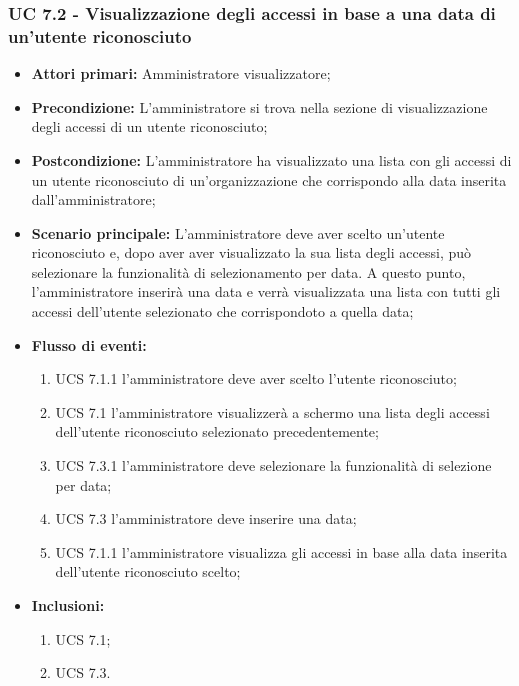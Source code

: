 \subsubsection{UC 7.2 - Visualizzazione degli accessi in base a una data di un'utente riconosciuto}%
\begin{itemize}
	\item \textbf{Attori primari:} Amministratore visualizzatore;
	\item \textbf{Precondizione:} L'amministratore si trova nella sezione di visualizzazione degli accessi di un utente riconosciuto;
	\item \textbf{Postcondizione:} L'amministratore ha visualizzato una lista con gli accessi di un utente riconosciuto di un'organizzazione che corrispondo alla data inserita dall'amministratore;
	\item \textbf{Scenario principale:} L'amministratore deve aver scelto un'utente riconosciuto e, dopo aver aver visualizzato la sua lista degli accessi, può selezionare la funzionalità di selezionamento per data. A questo punto, l'amministratore inserirà una data e verrà visualizzata una lista con tutti gli accessi dell'utente selezionato che corrispondoto a quella data;
	\item \textbf{Flusso di eventi:} 
	\begin{enumerate}
		\item UCS 7.1.1 l'amministratore deve aver scelto l'utente riconosciuto;
		\item UCS 7.1 l'amministratore visualizzerà a schermo una lista degli accessi dell'utente riconosciuto selezionato precedentemente;
		\item UCS 7.3.1 l'amministratore deve selezionare la funzionalità di selezione per data;
		\item UCS 7.3 l'amministratore deve inserire una data;
		\item UCS 7.1.1 l'amministratore visualizza gli accessi in base alla data inserita dell'utente riconosciuto scelto;
	\end{enumerate}
	\item \textbf{Inclusioni:}
	\begin{enumerate}
		\item UCS 7.1;
		\item UCS 7.3.
	\end{enumerate}
\end{itemize}

